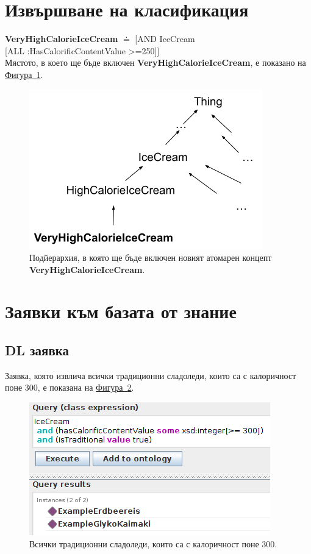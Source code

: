 \documentclass[12pt]{article}
\newcommand*{\MyIndent}{\hspace*{7em}}
\begin{document}
\section{Извършване на класификация}

\textbf{VeryHighCalorieIceCream} $\doteq$ [AND IceCream \\
                                             \MyIndent \MyIndent [ALL :HasCalorificContentValue >=250]] \\

Мястото, в което ще бъде включен \textbf{VeryHighCalorieIceCream}, е показано на \hyperref[fig:hierarchy]{Фигура~\ref*{fig:hierarchy}}.

\begin{figure}
\centering
    \includegraphics[scale=0.7]{./images/hierarchy.png}
  \caption{Подйерархия, в която ще бъде включен новият атомарен концепт \textbf{VeryHighCalorieIceCream}.}
  \label{fig:hierarchy}
\end{figure}

\section{Заявки към базата от знание}

    \subsection{DL заявка}

        Заявка, която извлича всички традиционни сладоледи, които са с калоричност поне 300, е показана на \hyperref[fig:dl1]{Фигура~\ref*{fig:dl1}}.
        
        \begin{figure}
        \centering
            \includegraphics[scale=0.7]{./images/dl1.png}
            \caption{Всички традиционни сладоледи, които са с калоричност поне 300.}
            \label{fig:dl1}
        \end{figure}
        
\end{document}
